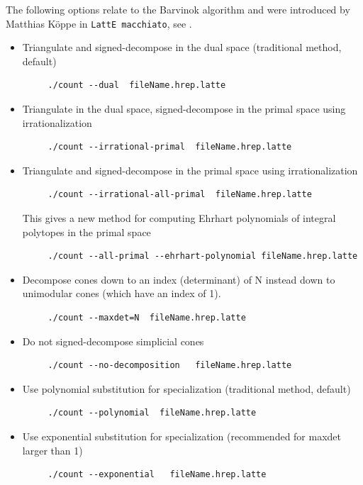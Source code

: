 \documentclass{article}
\newcommand{\latteMac}{{\tt LattE macchiato}\xspace}
\begin{document}
The following options relate to the Barvinok algorithm and were introduced by Matthias K\"oppe in \latteMac, see \cite{koeppe:irrational-barvinok}.
\begin{itemize}
\item Triangulate and signed-decompose in the dual space (traditional method, default)
	\begin{verbatim}
     ./count --dual  fileName.hrep.latte
	\end{verbatim} 
\item Triangulate in the dual space, signed-decompose in the primal space using irrationalization
	\begin{verbatim}
     ./count --irrational-primal  fileName.hrep.latte
	\end{verbatim} 
\item Triangulate and signed-decompose in the primal space  using irrationalization
	\begin{verbatim}
     ./count --irrational-all-primal  fileName.hrep.latte
	\end{verbatim} 
	This gives a new method for computing Ehrhart polynomials of integral polytopes 
   in the primal space
	\begin{verbatim}
     ./count --all-primal --ehrhart-polynomial fileName.hrep.latte
	\end{verbatim} 
   
\item  Decompose cones down to an index (determinant) of N instead down to unimodular cones (which have an index of 1).
	\begin{verbatim}
     ./count --maxdet=N  fileName.hrep.latte
	\end{verbatim} 
\item Do not signed-decompose simplicial cones
	\begin{verbatim}
     ./count --no-decomposition   fileName.hrep.latte
	\end{verbatim} 
\item Use polynomial substitution for specialization (traditional method, default)
	\begin{verbatim}
     ./count --polynomial  fileName.hrep.latte
	\end{verbatim} 	
\item Use exponential substitution for specialization (recommended for maxdet larger than 1)
	\begin{verbatim}
     ./count --exponential   fileName.hrep.latte
	\end{verbatim} 	
			
\end{itemize}
\end{document}
